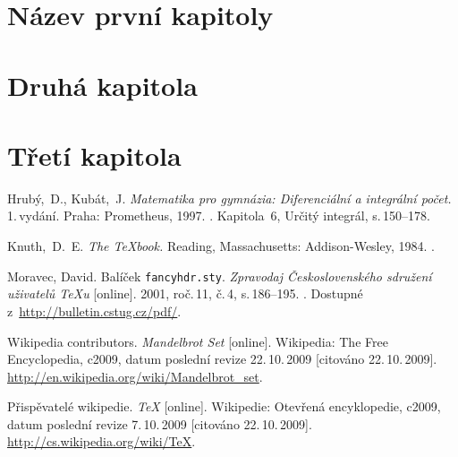 \documentclass{vskpou} %
\begin{document}
\section{Název první kapitoly}




\section{Druhá kapitola}



\section{Třetí kapitola}



\stranyresume

\begin{thebibliography}{9}

 Hrubý,~D., Kubát,~J. \textit{Matematika pro gymnázia: Diferenciální a integrální počet.} 1.\,vydání. Praha: Prometheus, 1997. . Kapitola~6, Určitý integrál, s.\,150--178.

 Knuth,~D.~E. \textit{The \TeX book.} Reading, Massachusetts: Addison-Wesley, 1984. .

 Moravec, David. Balíček \texttt{fancyhdr.sty}. \textit{Zpravodaj Československého sdružení uživatelů \TeX u} [online]. 2001, roč.\,11, č.\,4, s.\,186--195. . Dostupné z~\url{http://bulletin.cstug.cz/pdf/}.

 Wikipedia contributors. \textit{Mandelbrot Set} [online]. Wikipedia: The Free Encyclopedia, c2009, datum poslední revize 22.\,10.\,2009 [citováno 22.\,10.\,2009].
\url{http://en.wikipedia.org/wiki/Mandelbrot_set}.

 Přispěvatelé wikipedie. \textit{\TeX} [online]. Wikipedie: Otevřená encyklopedie, c2009, datum poslední revize 7.\,10.\,2009 [citováno 22.\,10.\,2009].
\url{http://cs.wikipedia.org/wiki/TeX}.

\end{thebibliography}
\end{document}
